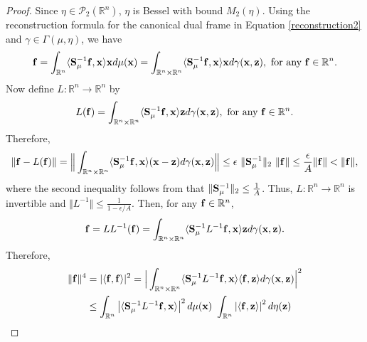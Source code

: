 \documentclass[10pt,a4paper]{amsart}
\begin{document}
\begin{proof}
Since $\eta \in \mathcal{P}_2(\mathbb{R}^n)$, $\eta$ is Bessel with bound  $M_2(\eta)$.  Using the reconstruction formula for the canonical dual frame in Equation \eqref{reconstruction2} and $\gamma \in \Gamma(\mu, \eta)$, we have
$$ 
{\bf f} =\int_{\mathbb{R}^n} \langle {\bf S}_\mu^{-1} {\bf f}, {\bf x} \rangle {\bf x}  d\mu({\bf x}) = \int_{\mathbb{R}^n \times \mathbb{R}^n} \langle {\bf S}_\mu^{-1} {\bf f}, {\bf x} \rangle {\bf x} d \gamma({\bf x},{\bf z})  , \ \text{for any} \ {\bf f} \in \mathbb{R}^n.
$$
Now define $L: \mathbb{R}^n \rightarrow \mathbb{R}^n$ by 
     \begin{equation*}
         L({\bf f}) = \int_{\mathbb{R}^n \times \mathbb{R}^n} \langle {\bf S}_\mu^{-1} {\bf f}, {\bf x} \rangle {\bf z}  d \gamma({\bf x},{\bf z}), \ \text{for any} \ {\bf f} \in \mathbb{R}^n.
     \end{equation*}
Therefore, 
\begin{equation*}
    \Vert {\bf f} -L({\bf f}) \Vert 
    = \Big \Vert \int_{\mathbb{R}^n \times \mathbb{R}^n} \langle {\bf S}_\mu^{-1}{\bf f}, {\bf x} \rangle ({\bf x}-{\bf z}) d \gamma({\bf x}, {\bf z}) \Big \Vert 
     \leq \epsilon \ \Vert {\bf S}_\mu^{-1} \Vert_2 \ \Vert  {\bf f} \Vert  \leq \frac{\epsilon}{A}  \Vert  {\bf f} \Vert < \Vert  {\bf f} \Vert,
\end{equation*}
where the second inequality follows from that $\|{\bf S}_\mu^{-1}\|_2 \leq \frac{1}{A}$. 
Thus, $L: \mathbb{R}^n \rightarrow \mathbb{R}^n$ is invertible and $\Vert L^{-1} \Vert \leq \frac{1}{1-\epsilon/ A}$.
Then, for any ${\bf f} \in \mathbb{R}^n$, 
\begin{equation*}
    {\bf f} = LL^{-1}({\bf f}) =  \int_{\mathbb{R}^n \times \mathbb{R}^n} \langle {\bf S}_\mu^{-1}L^{-1} {\bf f}, {\bf x} \rangle {\bf z} d\gamma({\bf x},{\bf z}).
\end{equation*}
Therefore, 
\begin{equation*}
\begin{split}
   \Vert {\bf f} \Vert^4 &=  |\langle {\bf f}, {\bf f} \rangle|^2 = \Big \vert \int_{\mathbb{R}^n \times \mathbb{R}^n} \langle {\bf S}_\mu^{-1}L^{-1} {\bf f}, {\bf x} \rangle \langle  {\bf f}, {\bf z} \rangle d \gamma({\bf x},{\bf z}) \Big \vert^2 \\
    & \leq \int_{\mathbb{R}^n} \left|\langle {\bf S}_\mu^{-1} L^{-1}{\bf f}, {\bf x} \rangle \right|^2 d\mu({\bf x})  \ \int_{\mathbb{R}^n} \left| \langle {\bf f}, {\bf z} \rangle \right|^2 d\eta({\bf z})\\

\end{split}
\end{equation*}
\end{proof}
\end{document}
